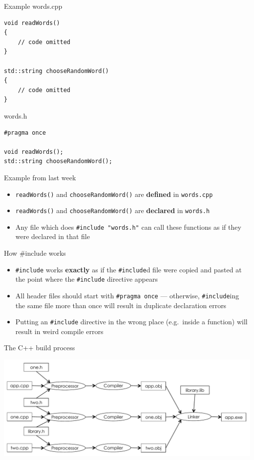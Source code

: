 \begin{frame}[fragile]{Example}
    words.cpp
    \begin{lstlisting}
void readWords()
{
    // code omitted
}

std::string chooseRandomWord()
{
    // code omitted
}
    \end{lstlisting}
    
    words.h
    \begin{lstlisting}
#pragma once

void readWords();
std::string chooseRandomWord();
    \end{lstlisting}
\end{frame}

\begin{frame}[fragile]{Example from last week}
    \begin{itemize}
        \item \lstinline{readWords()} and \lstinline{chooseRandomWord()} are \textbf{defined} in \texttt{words.cpp} \pause
        \item \lstinline{readWords()} and \lstinline{chooseRandomWord()} are \textbf{declared} in \texttt{words.h} \pause
        \item Any file which does \lstinline{#include "words.h"} can call these functions as if they were declared in that file
    \end{itemize}
\end{frame}

\begin{frame}[fragile]{How \#include works}
    \begin{itemize}
        \item \lstinline{#include} works \textbf{exactly} as if the \lstinline{#include}d file were copied and pasted
            at the point where the \lstinline{#include} directive appears \pause
        \item All header files should start with \lstinline{#pragma once} --- otherwise,
            \lstinline{#include}ing the same file more than once will result in duplicate declaration errors \pause
        \item Putting an \lstinline{#include} directive in the wrong place (e.g.\ inside a function) will result in
            weird compile errors
    \end{itemize}
\end{frame}

\begin{frame}{The C++ build process}
	\begin{center}
		\includegraphics[width=\textwidth]{compiler_flowchart}
	\end{center}
\end{frame}

